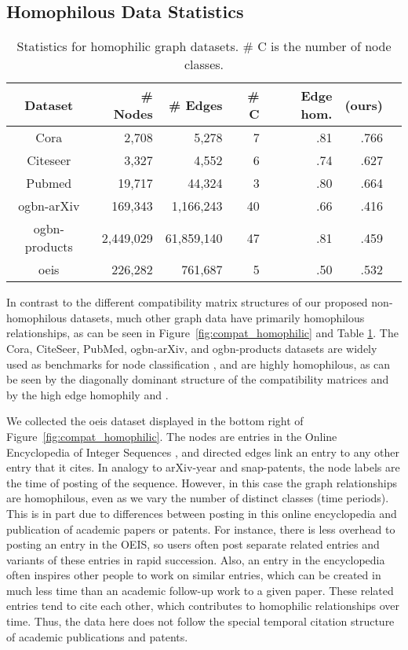 \documentclass{article}
\begin{document}
\subsection{Homophilous Data Statistics}\label{sec:homophilous_stats}

\begin{table}[ht]
    \centering
    \caption{Statistics for homophilic graph datasets. \# C is the number of node classes.}
    \label{tab:homophilic_stats}
    {\footnotesize
    \begin{tabular}{crrrrrr}
    \toprule
    Dataset & \# Nodes & \# Edges &   \# C &  Edge hom. &  (ours) \\
    \midrule
         Cora & 2,708 & 5,278 &  7 &  .81 & .766\\
         Citeseer & 3,327 & 4,552 &  6 &  .74 & .627\\
         Pubmed & 19,717 & 44,324 &  3 &  .80 & .664\\
         ogbn-arXiv & 169,343 & 1,166,243 &  40 &  .66 & .416\\
         ogbn-products & 2,449,029 & 61,859,140 &  47 &  .81 & .459 \\
         oeis & 226,282 & 761,687  & 5 &  .50 & .532 \\
    \bottomrule
    \end{tabular}
    }
\end{table}

In contrast to the different compatibility matrix structures of our proposed non-homophilous datasets, much other graph data have primarily homophilous relationships, as can be seen in Figure~\ref{fig:compat_homophilic} and Table \ref{tab:homophilic_stats}. The Cora, CiteSeer, PubMed, ogbn-arXiv, and ogbn-products datasets are widely used as benchmarks for node classification \cite{yang2016revisiting, hu2020open}, and are highly homophilous, as can be seen by the diagonally dominant structure of the compatibility matrices and by the high edge homophily and .

We collected the oeis dataset displayed in the bottom right of Figure~\ref{fig:compat_homophilic}. The nodes are entries in the Online Encyclopedia of Integer Sequences \cite{sloane2007line}, and directed edges link an entry to any other entry that it cites. In analogy to arXiv-year and snap-patents, the node labels are the time of posting of the sequence. However, in this case the graph relationships are homophilous, even as we vary the number of distinct classes (time periods). This is in part due to differences between posting in this online encyclopedia and publication of academic papers or patents. For instance, there is less overhead to posting an entry in the OEIS, so users often post separate related entries and variants of these entries in rapid succession. Also, an entry in the encyclopedia often inspires other people to work on similar entries, which can be created in much less time than an academic follow-up work to a given paper. These related entries tend to cite each other, which contributes to homophilic relationships over time. Thus, the data here does not follow the special temporal citation structure of academic publications and patents.
\end{document}
